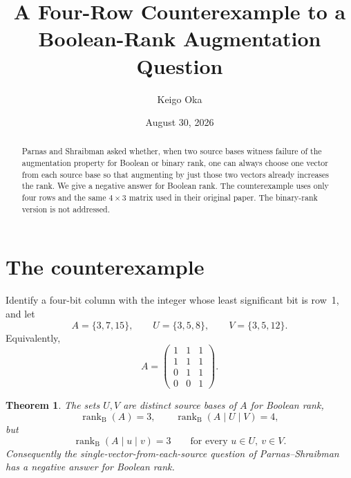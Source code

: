 \documentclass[11pt]{article}
\title{A Four-Row Counterexample to a Boolean-Rank Augmentation Question}
\author{Keigo Oka}
\date{August 30, 2026}
\newtheorem{theorem}{Theorem}
\begin{document}
\maketitle

\begin{abstract}
Parnas and Shraibman asked whether, when two source bases witness failure of the augmentation property for Boolean or binary rank, one can always choose one vector from each source base so that augmenting by just those two vectors already increases the rank. We give a negative answer for Boolean rank. The counterexample uses only four rows and the same $4\times3$ matrix used in their original paper. The binary-rank version is not addressed.
\end{abstract}

\section{The counterexample}
Identify a four-bit column with the integer whose least significant bit is row~1, and let
\[
A=\{3,7,15\},\qquad U=\{3,5,8\},\qquad V=\{3,5,12\}.
\]
Equivalently,
\[
A=\begin{pmatrix}1&1&1\\1&1&1\\0&1&1\\0&0&1\end{pmatrix}.
\]

\begin{theorem}
The sets $U,V$ are distinct source bases of $A$ for Boolean rank,
\[
\operatorname{rank}_{\mathrm B}(A)=3,\qquad
\operatorname{rank}_{\mathrm B}(A\mid U\mid V)=4,
\]
but
\[
\operatorname{rank}_{\mathrm B}(A\mid u\mid v)=3
\qquad\text{for every }u\in U,\ v\in V.
\]
Consequently the single-vector-from-each-source question of Parnas--Shraibman has a negative answer for Boolean rank.
\end{theorem}
\end{document}
